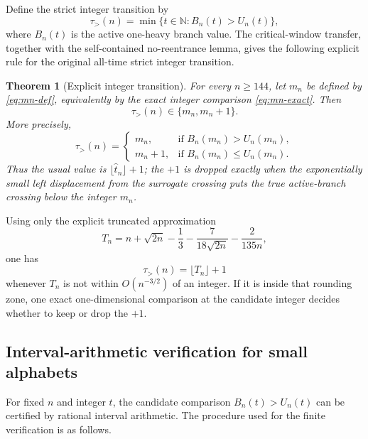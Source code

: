 \documentclass[11pt]{article}
\newtheorem{theorem}{Theorem}[section]
\theoremstyle{definition}
\begin{document}
Define the strict integer transition by
\[
  \tau_>(n)=\min\{t\in\mathbb N:B_n(t)>U_n(t)\},
\]
where $B_n(t)$ is the active one-heavy branch value.  The critical-window transfer, together with the self-contained no-reentrance lemma, gives the following explicit rule for the original all-time strict integer transition.

\begin{theorem}[Explicit integer transition]\label{thm:explicit-integer}
For every $n\ge144$, let $m_n$ be defined by \eqref{eq:mn-def}, equivalently by the exact integer comparison \eqref{eq:mn-exact}.  Then
\[
  \tau_>(n)\in\{m_n,m_n+1\}.
\]
More precisely,
\[
  \boxed{
  \tau_>(n)=
  \begin{cases}
  m_n, & \text{if }B_n(m_n)>U_n(m_n),\\[1mm]
  m_n+1, & \text{if }B_n(m_n)\le U_n(m_n).
  \end{cases}}
\]
Thus the usual value is $\lfloor\widehat t_n\rfloor+1$; the $+1$ is dropped exactly when the exponentially small left displacement from the surrogate crossing puts the true active-branch crossing below the integer $m_n$.
\end{theorem}

Using only the explicit truncated approximation
\[
  T_n=n+\sqrt{2n}-\frac13-\frac{7}{18\sqrt{2n}}-\frac2{135n},
\]
one has
\[
  \tau_>(n)=\lfloor T_n\rfloor+1
\]
whenever $T_n$ is not within $O(n^{-3/2})$ of an integer. If it is inside that rounding zone, one exact one-dimensional comparison at the candidate integer decides whether to keep or drop the $+1$.

\subsection{Interval-arithmetic verification for small alphabets}

For fixed $n$ and integer $t$, the candidate comparison $B_n(t)>U_n(t)$ can be certified by rational interval arithmetic.  The procedure used for the finite verification is as follows.
\end{document}
